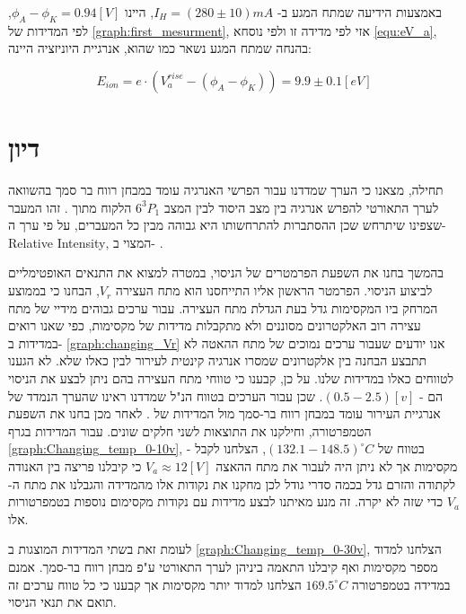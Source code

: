 \documentclass{article}
\begin{document}
באמצעות הידיעה שמתח המגע ב-
$I_H = (280 \pm 10) mA$,
היינו
$\phi_A - \phi_K = 0.94 [V]$,
לפי המדידות של
\ref{graph:first_mesurment},
אזי לפי מדידה זו ולפי נוסחא
\ref{equ:eV_a},
בהנחה שמתח המגע נשאר כמו שהוא, אנרגיית היוניזציה היינה:

$$E_{ion} = e \cdot (V_a^{rise} - (\phi_A - \phi_K)) = 9.9 \pm 0.1 [eV]$$

\section{דיון}

תחילה, מצאנו כי הערך שמדדנו עבור הפרשי האנרגיה עומד במבחן רווח בר סמך בהשוואה לערך התאורטי להפרש אנרגיה בין מצב היסוד לבין המצב
$6^3P_1$
הלקוח מתוך
\cite{NIST_ASD}.
זהו המעבר שצפינו שיתרחש שכן ההסתברות להתרחשותו היא גבוהה מבין כל המעברים, על פי ערך
ה-
\textenglish{Relative Intensity},
המצוי ב-
\cite{NIST_ASD}.

בהמשך בחנו את השפעת הפרמטרים של הניסוי, במטרה למצוא את התנאים האופטימליים לביצוע הניסוי.
הפרמטר הראשון אליו התייחסנו הוא מתח העצירה
$V_r$,
הבחנו כי בממוצע המרחק ביו המקסימות גדל בעת הגדלת מתח העצירה.
עבור ערכים גבוהים מידיי של מתח עצירה רוב האלקטרונים מסוננים ולא מתקבלות מדידות של מקסימות, כפי שאנו רואים במדידות ב-
\ref{graph:changing_Vr}
אנו יודעים שעבור ערכים נמוכים של מתח ההאטה לא תתבצע הבחנה בין אלקטרונים שמסרו אנרגיה קינטית לעירור לבין כאלו שלא. לא הגענו לטווחים כאלו במדידות שלנו.
על כן, קבענו כי טווחי מתח העצירה בהם ניתן לבצע את הניסוי הם -
$(0.5 - 2.5)[v]$.
שכן עבור הערכים בטווח הנ"ל שמדדנו ראינו שהערך הנמדד של אנרגיית העירור עומד במבחן רווח בר-סמך מול המדידות של
\cite{NIST_ASD}.
לאחר מכן בחנו את השפעת הטמפרטורה, וחילקנו את התוצאות לשני חלקים שונים.
עבור המדידות בגרף
\ref{graph:Changing_temp_0-10v},
- בטווח של
$(132.1 - 148.5)^{\circ}C$,
הצלחנו לקבל מקסימות אך לא ניתן היה לעבור את מתח ההאצה
$V_a \approx 12 [V]$
כי קיבלנו פריצה בין האנודה לקתודה והזרם גדל בכמה סדרי גודל לכן מחקנו את נקודות אלו מהמדידה והגבלנו את מתח ה-
$V_a$
כדי שזה לא יקרה.
זה מנע מאיתנו לבצע מדידות עם נקודות מקסימום נוספות בטמפרטורות אלו.

לעומת זאת בשתי המדידות המוצגות ב
\ref{graph:Changing_temp_0-30v},
הצלחנו למדוד מספר מקסימות ואף קיבלנו התאמה ביניהן לערך התאורטי ע"פ מבחן רווח בר-סמך.
אמנם במדידה בטמפרטורה 
$169.5 ^{\circ}C$
הצלחנו למדוד יותר מקסימות אך קבענו כי כל טווח ערכים זה תואם את תנאי הניסוי.
\end{document}
